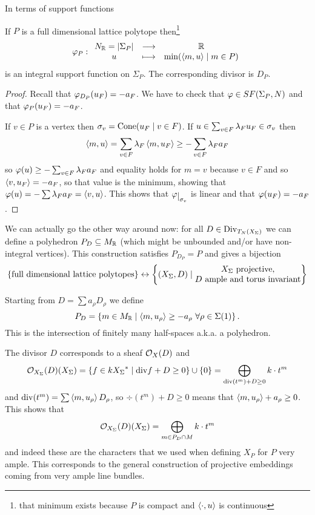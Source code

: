In terms of support functions
\begin{proposition}[]
If $P$ is a full dimensional lattice polytope then\footnote{that minimum exists because $P$ is compact and $\left\langle {\cdot,u}\right\rangle$ is continuous}
\[\varphi_P:\begin{array}{ccc} {N_{\mathbb{R}}=\left|{\Sigma_P}\right|} & \longrightarrow & {\mathbb{R}}\\ {u} & \longmapsto & {\min(\left\langle {m,u}\right\rangle\mid m\in P)} \end{array}\]
is an integral support function on $\Sigma_P$. The corresponding divisor is $D_P$.
\end{proposition}
\begin{proof}
Recall that $\varphi_{D_P}(u_F)=-a_F$. We have to check that $\varphi\in SF(\Sigma_P,N)$ and that $\varphi_P(u_F)=-a_F$.

If $v\in P$ is a vertex then $\sigma_v=\operatorname{Cone}(u_F\mid v\in F)$. If $u\in \sum_{v\in F}\lambda_F u_F\in \sigma_v$ then
\[\left\langle {m,u}\right\rangle=\sum_{v\in F}\lambda_F\left\langle {m,u_F}\right\rangle\geq -\sum_{v\in F}\lambda_F a_F\]
so $\varphi(u)\geq -\sum_{v\in F}\lambda_F a_F$ and equality holds for $m=v$ because $v\in F$ and so $\left\langle {v,u_F}\right\rangle=-a_F$, so that value is the minimum, showing that $\varphi(u)=-\sum \lambda_F a_F=\left\langle {v,u}\right\rangle$. This shows that $\vp\res{\sigma_v}$ is linear and that $\varphi(u_F)=-a_F$.
\end{proof}


We can actually go the other way around now: for all $D\in \operatorname{Div}_{T_N(X_\Sigma)}$ we can define a polyhedron $P_D\subseteq M_{\mathbb{R}}$ (which might be unbounded and/or have non-integral vertices). This construction satisfies $P_{D_P}=P$ and gives a bijection
\[\left\{{\text{full dimensional lattice polytopes}}\right\}\leftrightarrow\left\{{(X_\Sigma,D)\mid \begin{matrix}\text{$X_\Sigma$ projective,}\\\text{$D$ ample and torus invariant}\end{matrix}}\right\}\]

Starting from $D=\sum a_\rho D_\rho$ we define
\[P_D=\left\{{m\in M_{\mathbb{R}}\mid \left\langle {m,u_\rho}\right\rangle\geq -a_\rho\ \forall \rho\in\Sigma(1)}\right\}.\]
This is the intersection of finitely many half-spaces a.k.a. a polyhedron.


The divisor $D$ corresponds to a sheaf $\mathcal{O}_X(D)$ and
\[\mathcal{O}_{X_\Sigma}(D)(X_\Sigma)=\left\{{f\in k{X_\Sigma}^\ast\mid \mathrm{div} f+D\geq 0}\right\}\cup\left\{{0}\right\}=\bigoplus_{\mathrm{div}(t^m)+D\geq 0} k\cdot t^m\]
and $\mathrm{div}(t^m)=\sum \left\langle {m,u_\rho}\right\rangle D_\rho$, so $\div(t^m)+D\geq 0$ means that $\left\langle {m,u_\rho}\right\rangle+a_\rho\geq 0$. This shows that
\[\mathcal{O}_{X_\Sigma}(D)(X_\Sigma)=\bigoplus_{m\in P_D\cap M}k\cdot t^m\]
and indeed these are the characters that we used when defining $X_P$ for $P$ very ample. This corresponds to the general construction of projective embeddings coming from very ample line bundles.







